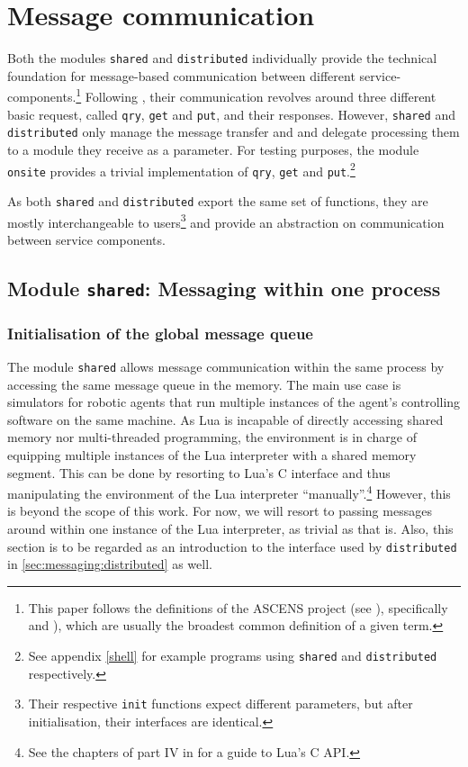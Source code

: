\chapter{Message communication}
\label{chap:messaging}

Both the modules \texttt{shared} and \texttt{distributed} individually provide the technical foundation for message-based communication between different service-components.\footnote{This paper follows the definitions of the ASCENS project (see \cite{ASCENS}), specifically \cite{AscensD41} and \cite{HoelzlWirsing2011}), which are usually the broadest common definition of a given term.} Following \cite{AscensD11}, their communication revolves around three different basic request, called \texttt{qry}, \texttt{get} and \texttt{put}, and their responses. However, \texttt{shared} and \texttt{distributed} only manage the message transfer and and delegate processing them to a module they receive as  a parameter. For testing purposes, the module \texttt{onsite} provides a trivial implementation of \texttt{qry}, \texttt{get} and \texttt{put}.\footnote{See appendix \ref{shell} for example programs using \texttt{shared} and \texttt{distributed} respectively.}

As both \texttt{shared} and \texttt{distributed} export the same set of functions, they are mostly interchangeable to users\footnote{Their respective \texttt{init} functions expect different parameters, but after initialisation, their interfaces are identical.} and provide an abstraction on communication between service components.

\section{Module \texttt{shared}: Messaging within one process}
\label{sec:messaging:shared}

\subsection{Initialisation of the global message queue}

The module \texttt{shared} allows message communication within the same process by accessing the same message queue in the memory. The main use case is simulators for robotic agents that run multiple instances of the agent's controlling software on the same machine. As Lua is incapable of directly accessing shared memory nor multi-threaded programming, the environment is in charge of equipping multiple instances of the Lua interpreter with a shared memory segment. This can be done by resorting to Lua's C interface and thus manipulating the environment of the Lua interpreter ``manually''.\footnote{See the chapters of part IV in \cite{Ierusalimschy2006} for a guide to Lua's C API.} However, this is beyond the scope of this work. For now, we will resort to passing messages around within one instance of the Lua interpreter, as trivial as that is. Also, this section is to be regarded as an introduction to the interface used by \texttt{distributed} in \ref{sec:messaging:distributed} as well.

